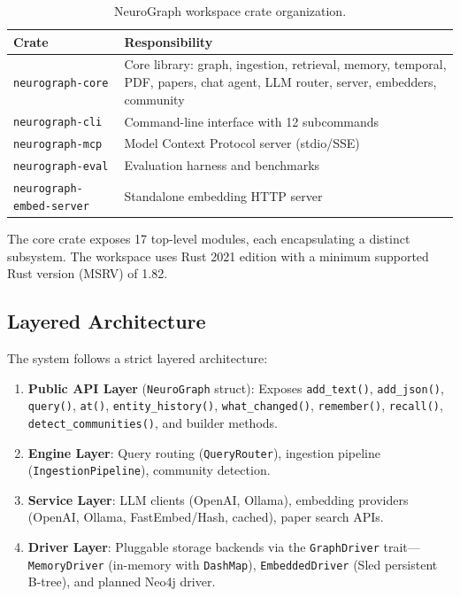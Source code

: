 \documentclass[11pt,a4paper,twocolumn]{article}
\begin{document}
\begin{table}[H]
\centering
\caption{NeuroGraph workspace crate organization.}
\label{tab:crates}
\begin{tabularx}{\columnwidth}{lX}
\toprule
\textbf{Crate} & \textbf{Responsibility} \\
\midrule
\texttt{neurograph-core} & Core library: graph, ingestion, retrieval,
  memory, temporal, PDF, papers, chat agent, LLM router, server,
  embedders, community \\
\texttt{neurograph-cli} & Command-line interface with 12 subcommands \\
\texttt{neurograph-mcp} & Model Context Protocol server (stdio/SSE) \\
\texttt{neurograph-eval} & Evaluation harness and benchmarks \\
\texttt{neurograph-embed-server} & Standalone embedding HTTP server \\
\bottomrule
\end{tabularx}
\end{table}

The core crate exposes 17 top-level modules, each encapsulating a
distinct subsystem. The workspace uses Rust 2021 edition with a
minimum supported Rust version (MSRV) of 1.82.

\subsection{Layered Architecture}

The system follows a strict layered architecture:

\begin{enumerate}[leftmargin=*]
  \item \textbf{Public API Layer} (\texttt{NeuroGraph} struct): Exposes
    \texttt{add\_text()}, \texttt{add\_json()}, \texttt{query()},
    \texttt{at()}, \texttt{entity\_history()}, \texttt{what\_changed()},
    \texttt{remember()}, \texttt{recall()}, \texttt{detect\_communities()},
    and builder methods.
  \item \textbf{Engine Layer}: Query routing
    (\texttt{QueryRouter}), ingestion pipeline
    (\texttt{IngestionPipeline}), community detection.
  \item \textbf{Service Layer}: LLM clients (OpenAI, Ollama),
    embedding providers (OpenAI, Ollama, FastEmbed/Hash, cached),
    paper search APIs.
  \item \textbf{Driver Layer}: Pluggable storage backends via the
    \texttt{GraphDriver} trait---\texttt{MemoryDriver} (in-memory
    with \texttt{DashMap}), \texttt{EmbeddedDriver} (Sled persistent
    B-tree), and planned Neo4j driver.
\end{enumerate}
\end{document}
